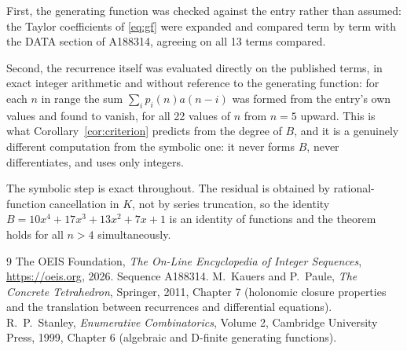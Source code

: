 \documentclass[11pt,a4paper]{article}
\theoremstyle{plain}
\theoremstyle{definition}
\begin{document}
First, the generating function was checked against the entry rather than assumed: the
Taylor coefficients of \eqref{eq:gf} were expanded and compared term by term with the DATA
section of A188314, agreeing on all 13 terms compared.

Second, the recurrence itself was evaluated directly on the published terms, in exact
integer arithmetic and without reference to the generating function: for each $n$ in range
the sum $\sum_{i}p_{i}(n)a(n-i)$ was formed from the entry's own values and found to
vanish, for all 22 values of $n$ from $n=5$ upward. This is what
Corollary~\ref{cor:criterion} predicts from the degree of $B$, and it is a genuinely
different computation from the symbolic one: it never forms $B$, never differentiates, and
uses only integers.

The symbolic step is exact throughout. The residual is obtained by rational-function
cancellation in $K$, not by series truncation, so the identity $B=10 x^{4} + 17 x^{3} + 13 x^{2} + 7 x + 1$ is an
identity of functions and the theorem holds for all $n>4$ simultaneously.

\begin{thebibliography}{9}
 The OEIS Foundation, \emph{The On-Line Encyclopedia of Integer Sequences},
\url{https://oeis.org}, 2026. Sequence A188314.
 M.~Kauers and P.~Paule, \emph{The Concrete Tetrahedron}, Springer, 2011,
Chapter 7 (holonomic closure properties and the translation between recurrences and
differential equations).
 R.~P.~Stanley, \emph{Enumerative Combinatorics}, Volume 2, Cambridge
University Press, 1999, Chapter 6 (algebraic and D-finite generating functions).
\end{thebibliography}
\end{document}
